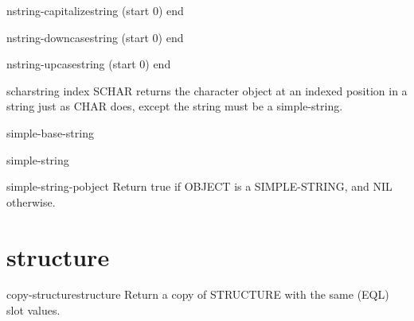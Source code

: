 \begin{function}{nstring-capitalize}{string \key (start 0) end}{}
  
\end{function}

\begin{function}{nstring-downcase}{string \key (start 0) end}{}
  
\end{function}

\begin{function}{nstring-upcase}{string \key (start 0) end}{}
  
\end{function}

\begin{accessor}{schar}{string index}{}
  SCHAR returns the character object at an indexed position in a string
   just as CHAR does, except the string must be a simple-string.
\end{accessor}

\begin{type}{simple-base-string}{}{}
  
\end{type}

\begin{type}{simple-string}{}{}
  
\end{type}

\begin{function}{simple-string-p}{object}{}
  Return true if OBJECT is a SIMPLE-STRING, and NIL otherwise.
\end{function}

\section{structure}

\begin{function}{copy-structure}{structure}{}
  Return a copy of STRUCTURE with the same (EQL) slot values.
\end{function}

